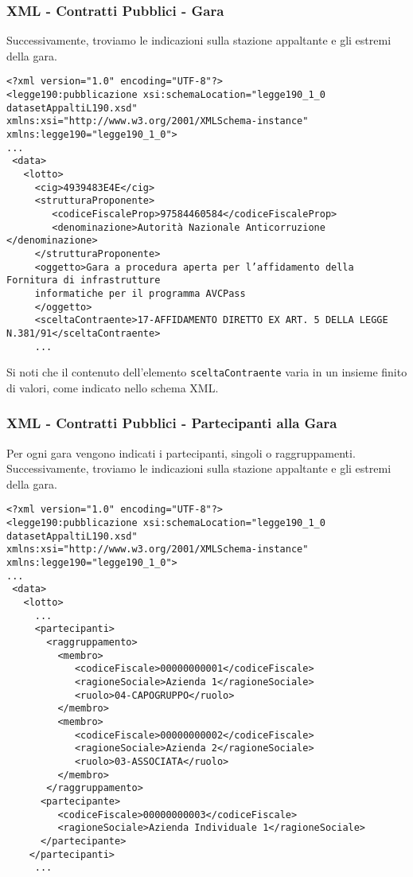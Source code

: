 \documentclass[8pt]{beamer}
\begin{document}
\begin{frame}[fragile]
 \frametitle{XML - Contratti Pubblici - Gara}
 Successivamente, troviamo le indicazioni sulla stazione appaltante e gli estremi della gara. 
 
\begin{small}
\begin{verbatim}
<?xml version="1.0" encoding="UTF-8"?> 
<legge190:pubblicazione xsi:schemaLocation="legge190_1_0 datasetAppaltiL190.xsd"
xmlns:xsi="http://www.w3.org/2001/XMLSchema-instance" xmlns:legge190="legge190_1_0">
...
 <data>
   <lotto>
     <cig>4939483E4E</cig>
     <strutturaProponente>
        <codiceFiscaleProp>97584460584</codiceFiscaleProp>
        <denominazione>Autorità Nazionale Anticorruzione </denominazione> 
     </strutturaProponente> 
     <oggetto>Gara a procedura aperta per l’affidamento della Fornitura di infrastrutture 
     informatiche per il programma AVCPass
     </oggetto>
     <sceltaContraente>17-AFFIDAMENTO DIRETTO EX ART. 5 DELLA LEGGE N.381/91</sceltaContraente>
     ...
 \end{verbatim}
\end{small}
  Si noti che il contenuto dell'elemento \texttt{sceltaContraente} varia in un insieme finito
  di valori, come indicato nello schema XML.
\end{frame}

\begin{frame}[fragile]
 \frametitle{XML - Contratti Pubblici - Partecipanti alla Gara}
 Per ogni gara vengono indicati i partecipanti, singoli o raggruppamenti.
 Successivamente, troviamo le indicazioni sulla stazione appaltante e gli estremi della gara. 
 
\begin{small}
\begin{verbatim}
<?xml version="1.0" encoding="UTF-8"?> 
<legge190:pubblicazione xsi:schemaLocation="legge190_1_0 datasetAppaltiL190.xsd"
xmlns:xsi="http://www.w3.org/2001/XMLSchema-instance" xmlns:legge190="legge190_1_0">
...
 <data>
   <lotto>
     ...
     <partecipanti>
       <raggruppamento>
         <membro>
            <codiceFiscale>00000000001</codiceFiscale>
            <ragioneSociale>Azienda 1</ragioneSociale>
            <ruolo>04-CAPOGRUPPO</ruolo>
         </membro>
         <membro>
            <codiceFiscale>00000000002</codiceFiscale>
            <ragioneSociale>Azienda 2</ragioneSociale>
            <ruolo>03-ASSOCIATA</ruolo>
         </membro>
       </raggruppamento>
      <partecipante>
         <codiceFiscale>00000000003</codiceFiscale>
         <ragioneSociale>Azienda Individuale 1</ragioneSociale>
      </partecipante>
    </partecipanti>
     ...
 \end{verbatim}
\end{small}
\end{frame}
\end{document}
